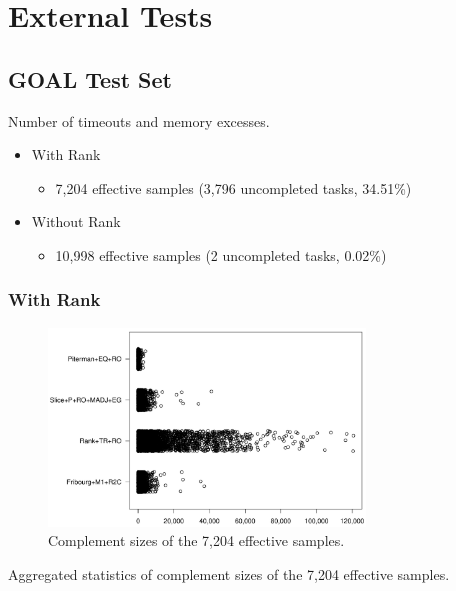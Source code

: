 \section{External Tests}
\label{ext}

\subsection{GOAL Test Set}

\begin{table}[ht]
\centering

\caption{Number of timeouts and memory excesses.}
\end{table}

\begin{itemize}
\item With Rank
  \begin{itemize}
  \item 7,204 effective samples (3,796 uncompleted tasks, 34.51\%)
  \end{itemize}
\item Without Rank
  \begin{itemize}
  \item 10,998 effective samples (2 uncompleted tasks, 0.02\%)
  \end{itemize}
\end{itemize}


\subsubsection{With Rank}

\begin{figure}[ht]
\centering
\includegraphics[width=0.75\textwidth]{figures/r/external/goal/s.stripchart.with_rank.pdf}
\caption{Complement sizes of the 7,204 effective samples.}
\end{figure}

\begin{table}[ht]
\centering

\caption{Aggregated statistics of complement sizes of the 7,204 effective samples.}
\end{table}

